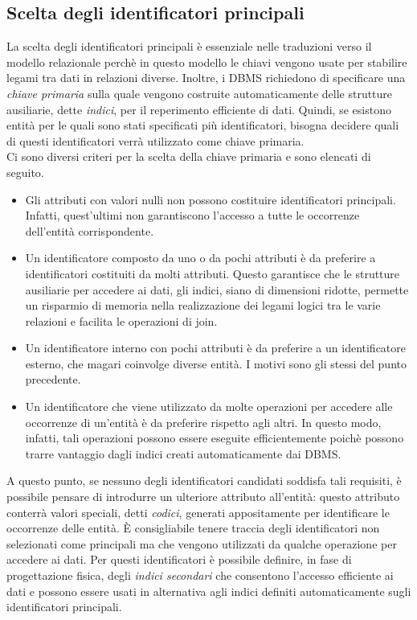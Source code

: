 \documentclass[12pt]{report}
\begin{document}
		\subsection{Scelta degli identificatori principali}
		La scelta degli identificatori principali è essenziale nelle traduzioni verso il modello relazionale perchè in questo modello le chiavi vengono usate per stabilire legami tra dati in relazioni diverse. Inoltre, i DBMS richiedono di specificare una \textit{chiave primaria} sulla quale vengono costruite automaticamente delle strutture ausiliarie, dette \textit{indici}, per il reperimento efficiente di dati. Quindi, se esistono entità per le quali sono stati specificati più identificatori, bisogna decidere quali di questi identificatori verrà utilizzato come chiave primaria. \\
		Ci sono diversi criteri per la scelta della chiave primaria e sono elencati di seguito.
		\begin{itemize}
			\item Gli attributi con valori nulli non possono costituire identificatori principali. Infatti, quest'ultimi non garantiscono l'accesso a tutte le occorrenze dell'entità corrispondente.
			\item Un identificatore composto da uno o da pochi attributi è da preferire a identificatori costituiti da molti attributi. Questo garantisce che le strutture ausiliarie per accedere ai dati, gli indici, siano di dimensioni ridotte, permette un risparmio di memoria nella realizzazione dei legami logici tra le varie relazioni e facilita le operazioni di join.
			\item Un identificatore interno con pochi attributi è da preferire a un identificatore esterno, che magari coinvolge diverse entità. I motivi sono gli stessi del punto precedente.
			\item Un identificatore che viene utilizzato da molte operazioni per accedere alle occorrenze di un'entità è da preferire rispetto agli altri. In questo modo, infatti, tali operazioni possono essere eseguite efficientemente poichè possono trarre vantaggio dagli indici creati automaticamente dai DBMS.
		\end{itemize}
		A questo punto, se nessuno degli identificatori candidati soddisfa tali requisiti, è possibile pensare di introdurre un ulteriore attributo all'entità: questo attributo conterrà  valori speciali, detti \textit{codici}, generati appositamente per identificare le occorrenze delle entità. È consigliabile tenere traccia degli identificatori non selezionati come principali ma che vengono utilizzati da qualche operazione per accedere ai dati. Per questi identificatori è possibile definire, in fase di progettazione fisica, degli \textit{indici secondari} che consentono l'accesso efficiente ai dati e possono essere usati in alternativa agli indici definiti automaticamente sugli identificatori principali.
\end{document}
